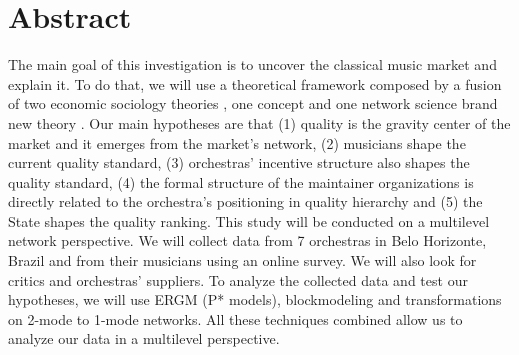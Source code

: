 \documentclass[a4paper, 12pt, openright, oneside, german, french, brazil, english, article]{abntex2}
\begin{document}
	\textual
	\maketitle
	
	\section*{Abstract}
		The main goal of this investigation is to uncover the classical music market and explain it. To do that, we will use a theoretical framework composed by a fusion of two economic sociology theories \cite{white2002markets,fligstein2002architecture}, one concept \cite{dimaggio1983iron} and one network science brand new theory \cite{lazega2016multilevel}. Our main hypotheses are that (1) quality is the gravity center of the market and it emerges from the market's network, (2) musicians shape the current quality standard, (3) orchestras' incentive structure also shapes the quality standard, (4) the formal structure of the maintainer organizations is directly related to the orchestra's positioning in quality hierarchy and (5) the State shapes the quality ranking. This study will be conducted on a multilevel network perspective. We will collect data from 7 orchestras in Belo Horizonte, Brazil and from their musicians using an online survey. We will also look for critics and orchestras' suppliers. To analyze the collected data and test our hypotheses, we will use ERGM (P* models), blockmodeling and transformations on 2-mode to 1-mode networks. All these techniques combined allow us to analyze our data in a multilevel perspective.	
		
		
		
				
	\postextual
	
	
	\anexos
	
\end{document}
